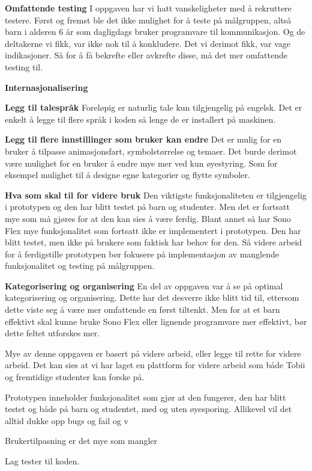 \textbf{Omfattende testing}
I oppgaven har vi hatt vanskeligheter med å rekruttere testere. Først og fremst ble det ikke mulighet for å teste på målgruppen, altså barn i alderen 6 år som dagligdags bruker programvare til kommunikasjon. Og de deltakerne vi fikk, var ikke nok til å konkludere. Det vi derimot fikk, var vage indikasjoner. Så for å få bekrefte eller avkrefte disse, må det mer omfattende testing til. 


\textbf{Internasjonalisering}

\textbf{Legg til talespråk}
Foreløpig er naturlig tale kun tilgjengelig på engelsk. Det er enkelt å legge til flere språk i koden så lenge de er installert på maskinen. 

\textbf{Legg til flere innstillinger som  bruker kan endre}
Det er mulig for en bruker å tilpasse animasjonsfart, symbolstørrelse og temaer. Det burde derimot være mulighet for en bruker å endre mye mer ved kun øyestyring. Som for eksempel mulighet til å designe egne kategorier og flytte symboler. 

\textbf{Hva som skal til for videre bruk} 
Den viktigste funksjonaliteten er tilgjengelig i prototypen og den har blitt testet på barn og studenter. Men det er fortsatt mye som må gjøres for at den kan sies å være ferdig. Blant annet så har Sono Flex mye funksjonalitet som fortsatt ikke er implementert i prototypen. Den har blitt testet, men ikke på brukere som faktisk har behov for den. Så videre arbeid for å ferdigstille prototypen bør fokusere på implementasjon av manglende funksjonalitet og testing på målgruppen.

\textbf{Kategorisering og organisering}
En del av oppgaven var å se på optimal kategorisering og organisering. Dette har det desverre ikke blitt tid til, ettersom dette viste seg å være mer omfattende en først tiltenkt. Men for at et barn effektivt skal kunne bruke Sono Flex eller lignende programvare mer effektivt, bør dette feltet utforskes mer.


Mye av denne oppgaven er basert på videre arbeid, eller legge til rette for videre arbeid. Det kan sies at vi har laget en plattform for videre arbeid som både Tobii og fremtidige studenter kan forske på.


Prototypen inneholder funksjonalitet som gjør at den fungerer, den har blitt testet og både på barn og studentet, med og uten øyesporing. Allikevel vil det alltid dukke opp bugs og fail og v

Brukertilpasning er det mye som mangler

Lag tester til koden. 


